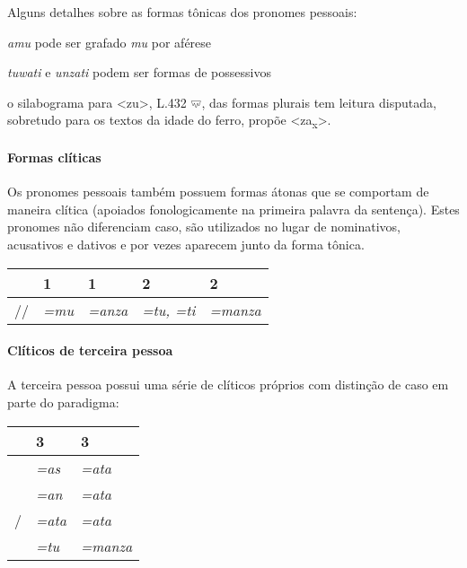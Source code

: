 \noindent Alguns detalhes sobre as formas tônicas dos pronomes pessoais:
\begin{compactitem}
	\item \emph{amu} pode ser grafado \emph{mu} por aférese
	\item \emph{tuwati} e \emph{unzati} podem ser formas de possessivos
	\item o silabograma para <zu>, L.432 𔗥, das formas plurais tem leitura disputada,
	sobretudo para os textos da idade do ferro, \citet[65--68]{Yakubovich2010}
	propõe <za\textsubscript{x}>.
\end{compactitem}

\paragraph{Formas clíticas}
Os pronomes pessoais também possuem formas átonas que se
comportam de maneira clítica (apoiados fonologicamente na primeira palavra da
sentença).
Estes pronomes não diferenciam caso, são utilizados no lugar de nominativos,
acusativos e dativos e por vezes aparecem junto da forma tônica.

\begin{center}
	\begin{tabular}[c]{lll|ll}
		\toprule
		                           & 1\Sg{}\emph{} & 1\Pl{}\emph{} & 2\Sg{}\emph{}   & 2\Pl{}\emph{} \\
		\midrule
		\Nom\slash\Acu\slash\Dat{} & \emph{=mu}    & \emph{=anza}  & \emph{=tu, =ti} & \emph{=manza} \\
		\bottomrule
	\end{tabular}
\end{center}


\paragraph{Clíticos de terceira pessoa}
A terceira pessoa possui uma série de clíticos próprios com distinção de caso em
parte do paradigma:

\begin{center}
	\begin{tabular}[c]{lll}
		\toprule
		                      & 3\Sg{}\emph{} & 3\Pl{}\emph{} \\
		\midrule
		\Nom{}\Com{}          & \emph{=as}    & \emph{=ata}   \\
		\Acu{}\Com{}          & \emph{=an}    & \emph{=ata}   \\
		\Nom\slash\Acu\Neut{} & \emph{=ata}   & \emph{=ata}   \\
		\Dat{}                & \emph{=tu}    & \emph{=manza} \\
		\bottomrule
	\end{tabular}
\end{center}

